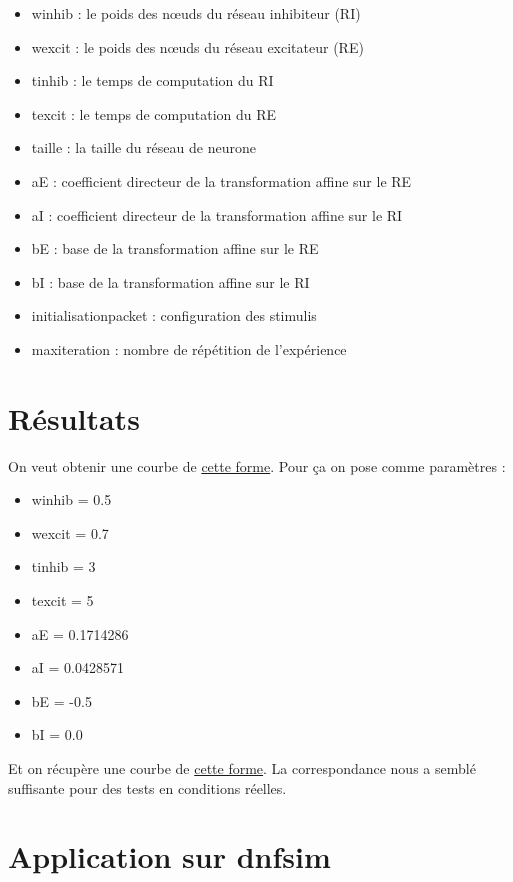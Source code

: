\documentclass{report}
\begin{document}
\begin{itemize}
	\item w\textunderscore inhib : le poids des nœuds du réseau inhibiteur (RI)
	\item w\textunderscore excit : le poids des nœuds du réseau excitateur (RE)
	\item t\textunderscore inhib : le temps de computation du RI
	\item t\textunderscore excit : le temps de computation du RE
	\item taille : la taille du réseau de neurone
	\item aE : coefficient directeur de la transformation affine sur le RE
	\item aI :  coefficient directeur de la transformation affine sur le RI
	\item bE :	 base de la transformation affine sur le RE
	\item bI :  base de la transformation affine sur le RI
	\item initialisation\textunderscore packet :  configuration des stimulis 
	\item maxiteration :  nombre de répétition de l'expérience
\end{itemize}

\section{Résultats}

On veut obtenir une courbe de \href{run:images/figure_1.png}{cette forme}. Pour ça on pose comme paramètres : 

\begin{itemize}
	\item w\textunderscore inhib = 0.5
	\item w\textunderscore excit = 0.7
	\item t\textunderscore inhib = 3
	\item t\textunderscore excit = 5
	\item aE = 0.1714286
	\item aI = 0.0428571
	\item bE = -0.5
	\item bI = 0.0
\end{itemize}

Et on récupère une courbe de \href{run:images/InhibExit2.png}{cette forme}. La correspondance nous a semblé suffisante pour des tests en conditions réelles.

\section{Application sur dnfsim}
\end{document}
